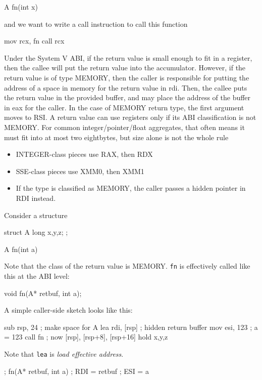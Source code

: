 \documentclass{report}
\begin{document}
\begin{itemize}
\begin{cppcode}
                A fn(int x) {
                }
            \end{cppcode}
            and we want to write a call instruction to call this function
            \bigbreak \noindent 
            \begin{cppcode}
            mov   rcx, fn
            call  rcx
            \end{cppcode}
            \bigbreak \noindent 
            Under the System V ABI, if the return value is small enough to fit in a register, then the callee will put the return value into the accumulator. However, if the return value is of type MEMORY, then the caller is responsible 
            for putting the address of a space in memory for the return value in rdi. Then, the callee puts the return value in the provided buffer, and may place the address of the buffer in eax for the caller.
            \bigbreak \noindent 
            In the case of MEMORY return type, the first argument moves to RSI.
            \bigbreak \noindent 
            A return value can use registers only if its ABI classification is not MEMORY. For common integer/pointer/float aggregates, that often means it must fit into at most two eightbytes, but size alone is not the whole rule
            \begin{itemize}
                \item INTEGER-class pieces use RAX, then RDX
                \item SSE-class pieces use XMM0, then XMM1
                \item If the type is classified as MEMORY, the caller passes a hidden pointer in RDI instead.
            \end{itemize}
            Consider a structure
            \bigbreak \noindent 
            \begin{cppcode}
                struct A {
                    long x,y,z;
                };

                A fn(int a) {}
            \end{cppcode}
            \bigbreak \noindent 
            Note that the class of the return value is MEMORY. \texttt{fn} is effectively called like this at the ABI level:
            \bigbreak \noindent 
            \begin{cppcode}
            void fn(A* retbuf, int a);
            \end{cppcode}
            \bigbreak \noindent 
            A simple caller-side sketch looks like this:
            \bigbreak \noindent 
            \begin{cppcode}
                sub     rsp, 24          ; make space for A
                lea     rdi, [rsp]       ; hidden return buffer
                mov     esi, 123         ; a = 123
                call    fn
                ; now [rsp], [rsp+8], [rsp+16] hold x,y,z
            \end{cppcode}
            \bigbreak \noindent 
            Note that \texttt{lea} is \textit{load effective address}.
            \bigbreak \noindent 
            \begin{cppcode}
                ; fn(A* retbuf, int a)
                ; RDI = retbuf
                ; ESI = a


\end{cppcode}
\end{itemize}
\end{document}
